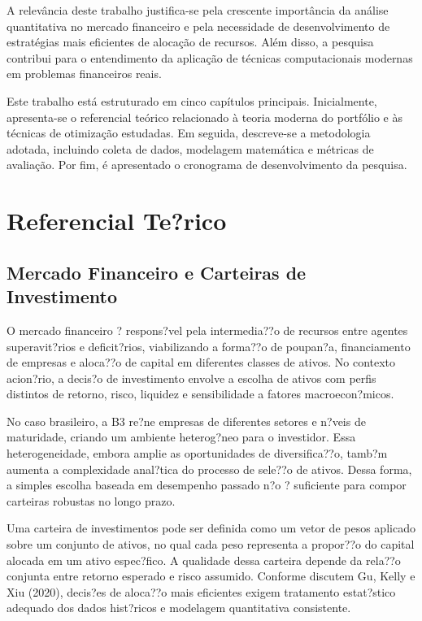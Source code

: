 ﻿\documentclass[
  12pt,
  oneside,
  a4paper,
  brazil
]{abntex2}
\begin{document}
A relevância deste trabalho justifica-se pela crescente importância da análise quantitativa no mercado financeiro e pela necessidade de desenvolvimento de estratégias mais eficientes de alocação de recursos. Além disso, a pesquisa contribui para o entendimento da aplicação de técnicas computacionais modernas em problemas financeiros reais.

Este trabalho está estruturado em cinco capítulos principais. Inicialmente, apresenta-se o referencial teórico relacionado à teoria moderna do portfólio e às técnicas de otimização estudadas. Em seguida, descreve-se a metodologia adotada, incluindo coleta de dados, modelagem matemática e métricas de avaliação. Por fim, é apresentado o cronograma de desenvolvimento da pesquisa.

\chapter{Referencial Te?rico}
\section{Mercado Financeiro e Carteiras de Investimento}
O mercado financeiro ? respons?vel pela intermedia??o de recursos entre agentes superavit?rios e deficit?rios, viabilizando a forma??o de poupan?a, financiamento de empresas e aloca??o de capital em diferentes classes de ativos. No contexto acion?rio, a decis?o de investimento envolve a escolha de ativos com perfis distintos de retorno, risco, liquidez e sensibilidade a fatores macroecon?micos.

No caso brasileiro, a B3 re?ne empresas de diferentes setores e n?veis de maturidade, criando um ambiente heterog?neo para o investidor. Essa heterogeneidade, embora amplie as oportunidades de diversifica??o, tamb?m aumenta a complexidade anal?tica do processo de sele??o de ativos. Dessa forma, a simples escolha baseada em desempenho passado n?o ? suficiente para compor carteiras robustas no longo prazo.

Uma carteira de investimentos pode ser definida como um vetor de pesos aplicado sobre um conjunto de ativos, no qual cada peso representa a propor??o do capital alocada em um ativo espec?fico. A qualidade dessa carteira depende da rela??o conjunta entre retorno esperado e risco assumido. Conforme discutem Gu, Kelly e Xiu (2020), decis?es de aloca??o mais eficientes exigem tratamento estat?stico adequado dos dados hist?ricos e modelagem quantitativa consistente.
\end{document}
